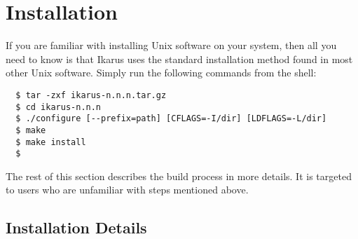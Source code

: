 \documentclass[onecolumn, 12pt, twoside, openright, dvipdfm]{book}
\begin{document}
\newpage

\section{Installation}

If you are familiar with installing Unix software on your system,
then all you need to know is that Ikarus uses the standard
installation method found in most other Unix software.  Simply run
the following commands from the shell:
\begin{verbatim}
  $ tar -zxf ikarus-n.n.n.tar.gz
  $ cd ikarus-n.n.n
  $ ./configure [--prefix=path] [CFLAGS=-I/dir] [LDFLAGS=-L/dir]
  $ make
  $ make install
  $
\end{verbatim}

The rest of this section describes the build process in more
details.  It is targeted to users who are unfamiliar with steps
mentioned above.

\subsection{Installation Details}
\end{document}

